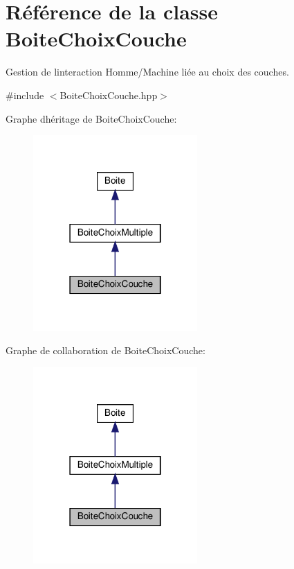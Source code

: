 \hypertarget{class_boite_choix_couche}{}\section{Référence de la classe Boite\+Choix\+Couche}
\label{class_boite_choix_couche}


Gestion de l\textquotesingle{}interaction Homme/\+Machine liée au choix des couches.  




{\ttfamily \#include $<$Boite\+Choix\+Couche.\+hpp$>$}



Graphe d\textquotesingle{}héritage de Boite\+Choix\+Couche\+:\nopagebreak
\begin{figure}[H]
\begin{center}
\leavevmode
\includegraphics[width=178pt]{class_boite_choix_couche__inherit__graph}
\end{center}
\end{figure}


Graphe de collaboration de Boite\+Choix\+Couche\+:\nopagebreak
\begin{figure}[H]
\begin{center}
\leavevmode
\includegraphics[width=178pt]{class_boite_choix_couche__coll__graph}
\end{center}
\end{figure}
